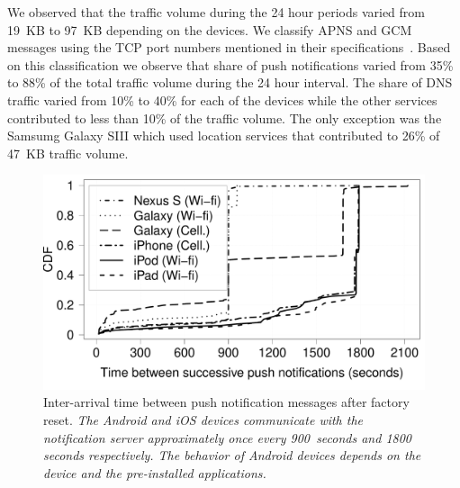 We observed that the traffic volume during the 24 hour periods varied from 19~KB to 97~KB depending on the devices. 
We classify APNS and GCM messages using the TCP port numbers mentioned in their specifications~\cite{gcm, apns}.
Based on this classification we observe that share of push notifications varied from 35\% to 88\% of the total traffic volume during the 24 hour interval. 
The share of DNS traffic varied from 10\% to 40\% for each of the devices while the other services contributed to less than 10\% of the traffic volume.
The only exception was the Samsumg Galaxy SIII which used location services that contributed to 26\% of 47~KB traffic volume.

\begin{figure}
\includegraphics[width=\columnwidth]{plots/push_inter_arrival.pdf}
\caption{Inter-arrival time between push notification messages after factory reset. \emph{The Android and iOS devices communicate with the notification server approximately once every 900~seconds and 1800 seconds respectively. The behavior of Android devices depends on the device and the pre-installed applications.}}
\label{fig:inter-arrival-push}
\end{figure}


